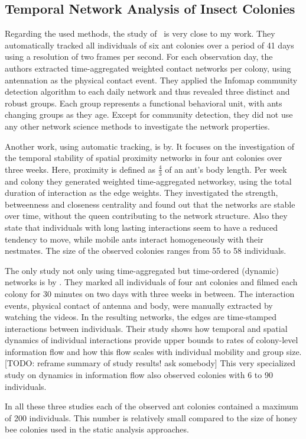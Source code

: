 \subsection{Temporal Network Analysis of Insect Colonies}

Regarding the used methods, the study of~\textcite{mersch2013tracking} is very close to my work.
They automatically tracked all individuals of six ant colonies over a period of 41 days using a resolution of two frames per second.
For each observation day, the authors extracted time-aggregated weighted contact networks per colony, using antennation as the physical contact event.
They applied the Infomap community detection algorithm to each daily network and thus revealed three distinct and robust groups.
Each group represents a functional behavioral unit, with ants changing groups as they age.
Except for community detection, they did not use any other network science methods to investigate the network properties.


Another work, using automatic tracking, is by\textcite{jeanson2012long}.
It focuses on the investigation of the temporal stability of spatial proximity networks in four ant colonies over three weeks.
Here, proximity is defined as $\frac{4}{3}$ of an ant’s body length.
Per week and colony they generated weighted time-aggregated networksy,  using the total duration of interaction as the edge weights.
They investigated the strength, betweenness and closeness centrality and found out that the networks are stable over time, without the queen contributing to the network structure.
Also they state that individuals with long lasting interactions seem to have a reduced tendency to move, while mobile ants interact homogeneously with their nestmates.
The size of the observed colonies ranges from 55 to 58 individuals.


The only study not only using time-aggregated but time-ordered (dynamic) networks is by \textcite{blonder2011time}.
They marked all individuals of four ant colonies and filmed each colony for 30 minutes on two days with three weeks in between.
The interaction events, physical contact of antenna and body, were manually extracted by watching the videos. In the resulting networks, the edges are  time-stamped interactions between individuals.
Their study shows how temporal and spatial dynamics of individual interactions provide upper bounds to rates of colony-level information flow and how this flow scales with individual mobility and group size. [TODO: reframe summary of study results! ask somebody]
This very specialized study on dynamics in information flow also observed colonies with 6 to 90 individuals.


In all these three studies each of the observed ant colonies contained a maximum of 200 individuals. This number is relatively small compared to the size of honey bee colonies used in the static analysis approaches.

